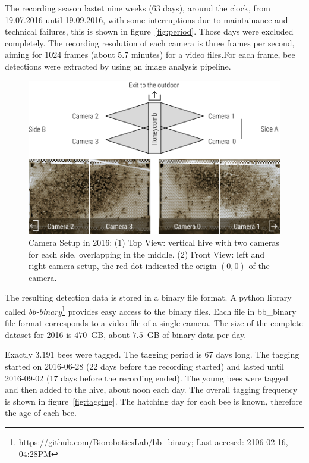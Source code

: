 The recording season lastet nine weeks (63 days), around the clock, from 19.07.2016 until 19.09.2016, with some interruptions due to maintainance and technical failures, this is shown in figure~\ref{fig:period}. Those days were excluded completely.
The recording resolution of each camera is three frames per second, aiming for $1024$ frames (about $5.7$ minutes) for a video files.For each frame, bee detections were extracted by using an image analysis pipeline.

\begin{figure}[htb]
	\centering
	\includegraphics[width=1.0\textwidth]{Figures/setupCams}
	\caption{Camera Setup in 2016: (1) Top View:  vertical hive with two cameras for each side, overlapping in the middle. (2) Front View: left and right camera setup, the red dot indicated the origin $(0,0)$ of the camera.}
	\label{fig:cams}
\end{figure}

The resulting detection data is stored in a binary file format. A python library called \emph{bb-binary}\footnote{\url{https://github.com/BioroboticsLab/bb_binary}; Last accesed: 2106-02-16, 04:28PM} provides easy access to the binary files. Each file in bb\_binary file format corresponds to a video file of a single camera.
The size of the complete dataset for 2016 is $470$~GB, about $7.5$~GB of binary data per day.

Exactly $3.191$ bees were tagged. The tagging period is 67 days long. The tagging started on 2016-06-28 (22 days before the recording started) and lasted until 2016-09-02 (17 days before the recording ended). The young bees were tagged and then added to the hive, about noon each day. The overall tagging frequency is shown in figure~\ref{fig:tagging}. The hatching day for each bee is known, therefore the age of each bee.

